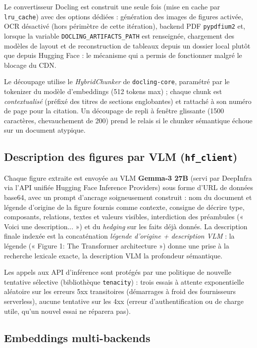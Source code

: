 Le convertisseur Docling est construit une seule fois (mise en cache par
\texttt{lru\_cache}) avec des options dédiées : génération des images de figures activée,
OCR désactivé (hors périmètre de cette itération), backend PDF \texttt{pypdfium2} et,
lorsque la variable \texttt{DOCLING\_ARTIFACTS\_PATH} est renseignée, chargement des
modèles de layout et de reconstruction de tableaux depuis un dossier local plutôt que
depuis Hugging Face : le mécanisme qui a permis de fonctionner malgré le blocage du CDN.

Le découpage utilise le \emph{HybridChunker} de \texttt{docling-core}, paramétré par le
tokenizer du modèle d'embeddings (512 tokens max) ; chaque chunk est \emph{contextualisé}
(préfixé des titres de sections englobantes) et rattaché à son numéro de page pour la
citation. Un découpage de repli à fenêtre glissante (1500 caractères, chevauchement de
200) prend le relais si le chunker sémantique échoue sur un document atypique.

\subsection{Description des figures par VLM (\texttt{hf\_client})}

Chaque figure extraite est envoyée au VLM \textbf{Gemma-3 27B} (servi par DeepInfra via
l'API unifiée Hugging Face Inference Providers) sous forme d'URL de données base64, avec
un prompt d'ancrage soigneusement construit : nom du document et légende d'origine de la
figure fournis comme contexte, consigne de décrire type, composants, relations, textes et
valeurs visibles, interdiction des préambules (« Voici une description... ») et du
\emph{hedging} sur les faits déjà donnés. La description finale indexée est la
concaténation \emph{légende d'origine + description VLM} : la légende (« Figure 1: The
Transformer architecture ») donne une prise à la recherche lexicale exacte, la
description VLM la profondeur sémantique.

Les appels aux API d'inférence sont protégés par une politique de nouvelle tentative
sélective (bibliothèque \texttt{tenacity}) : trois essais à attente exponentielle
aléatoire sur les erreurs 5xx transitoires (démarrages à froid des fournisseurs
serverless), aucune tentative sur les 4xx (erreur d'authentification ou de charge utile,
qu'un nouvel essai ne réparera pas).

\subsection{Embeddings multi-backends}

